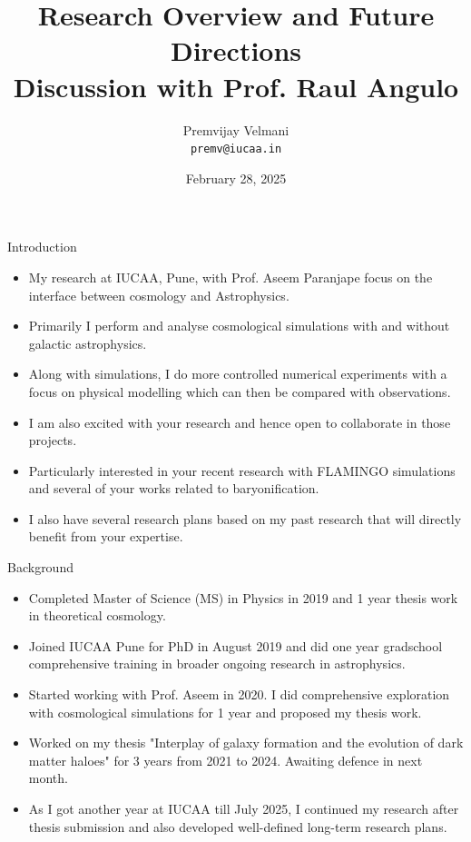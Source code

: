 \documentclass{beamer}
\title[Research Overview]{Research Overview and Future Directions \\ Discussion with Prof. Raul Angulo}
\author[Premvijay Velmani]{Premvijay Velmani \\ \texttt{premv@iucaa.in}}
\institute[IUCAA]{Inter-University Centre for Astronomy and Astrophysics (IUCAA), Pune \\
PhD Supervisor : Prof. Aseem Paranjape}
\date[Interview with Prof Raul Angulo]{February 28, 2025}
\begin{document}
\begin{frame}
    \titlepage
\end{frame}



\begin{frame}{Introduction}
\begin{itemize}
\item My research at IUCAA, Pune, with Prof. Aseem Paranjape focus on the interface between cosmology and Astrophysics.
\item Primarily I perform and analyse cosmological simulations with and without galactic astrophysics.
\item Along with simulations, I do more controlled numerical experiments with a focus on physical modelling which can then be compared with observations.
\item I am also excited with your research and hence open to collaborate in those projects.
\item Particularly interested in your recent research with FLAMINGO simulations and several of your works related to baryonification.
\item I also have several research plans based on my past research that will directly benefit from your expertise. 
\end{itemize}
\end{frame}

\begin{frame}{Background} 
    \begin{itemize}
        \item Completed Master of Science (MS) in Physics in 2019 and 1 year thesis work in theoretical cosmology.
        \item Joined IUCAA Pune for PhD in August 2019 and did one year gradschool comprehensive training in broader ongoing research in astrophysics.
        \item Started working with Prof. Aseem in 2020. I did comprehensive exploration with cosmological simulations for 1 year and proposed my thesis work.
        \item Worked on my thesis "Interplay of galaxy formation and the evolution of dark matter haloes" for 3 years from 2021 to 2024. Awaiting defence in next month.
        \item As I got another year at IUCAA till July 2025, I continued my research after thesis submission and also developed well-defined long-term research plans. 
    \end{itemize}
\end{frame}
\end{document}
